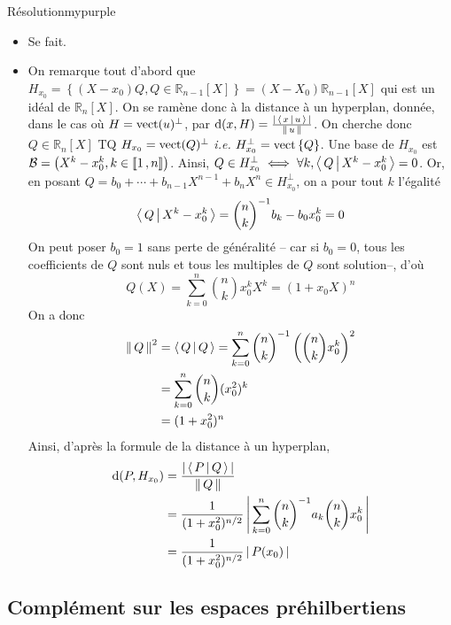         \begin{demo}{Résolution}{mypurple}
            \begin{itemize}
                \item Se fait.
                \item On remarque tout d’abord que $H_{x_0} = \left\{(X - x_0)Q, Q \in \mathbb{R}_{n-1}[X]\right\} = (X - X_0) \mathbb{R}_{n-1}[X]$ qui est un idéal de $\mathbb{R}_n[X]$. On se ramène donc à la distance à un hyperplan, donnée, dans le cas où $H = \operatorname{vect}(u)^{\perp}$, par $\operatorname{d}(x,H) = \frac{\left\lvert \,\left<\,x\,\middle|\,u\,\right> \, \right\rvert}{\left\lVert \,u \, \right\rVert}$. On cherche donc $Q \in \mathbb{R}_n[X]$ TQ $H_{x_0} = \operatorname{vect}(Q)^{\perp}$ \textit{i.e.} $H_{x_0}^{\perp} = \operatorname{vect}\left\{Q\right\}$. Une base de $H_{x_0}$ est $\mathcal{B} = \left(X^k - x_0^k , k \in \left\llbracket 1 \, , n \right\rrbracket\right)$. Ainsi, $Q \in H_{x_0}^{\perp} \iff \forall k, \left<\,Q\,\middle|\,X^k - x_0^k\,\right> = 0$. Or, en posant $Q = b_0 + \cdots + b_{n-1}X^{n-1} + b_n X^n \in H_{x_0}^{\perp}$, on a pour tout $k$ l’égalité \[ \left<\,Q\,\middle|\,X^k - x_0^k\,\right> = \binom{n}{k}^{-1} b_k - b_0 x_0^k = 0\]   
                On peut poser $b_0 = 1$ sans perte de généralité -- car si $b_0 = 0$, tous les coefficients de $Q$ sont nuls et tous les multiples de $Q$ sont solution--, d’où 
                \[ Q(X) = \sum_{k=0}^{n} \binom{n}{k } x_0^k X^k = \left(1 + x_0 X\right)^n \]    
                On a donc \begin{align*}
                    \left\lVert \,Q \, \right\rVert^2 
                    &= \left<\,Q\,\middle|\,Q\,\right> = \sum_{k=0}^{n} \binom{n }{k }^{-1} \left(\binom{n }{k } x_0^k\right)^2 \\
                    &= \sum_{k=0}^{n} \binom{n }{k } (x_0^2)^k \\
                    &= (1 + x_0^2)^n
                \end{align*}
                Ainsi, d’après la formule de la distance à un hyperplan,  
                \begin{align*}
                    \operatorname{d}(P,H_{x_0}) 
                    &= \frac{\left\lvert \,\left<\,P\,\middle|\,Q\,\right> \, \right\rvert}{\left\lVert \,Q \, \right\rVert} \\
                    &= \frac{1}{(1 + x_0^2)^{n / 2}} \left\lvert \,\sum_{k=0}^{n} \binom{n }{k }^{-1} a_k \binom{n }{k } x_0^k \, \right\rvert \\
                    &= \frac{1}{(1 + x_0^2)^{n / 2}} \left\lvert \,P(x_0) \, \right\rvert
                \end{align*}
            \end{itemize}  
        \end{demo}

    \subsection{Complément sur les espaces préhilbertiens}

